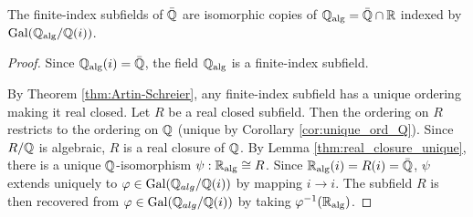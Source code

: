 \begin{theorem}
  \label{thm:Q_alg_unique_fin_ind}
  The finite-index subfields of $\bar{\mathbb{Q}}$ are isomorphic copies of $\mathbb{Q}_{\text{alg}}=\bar{\mathbb{Q}}\cap\mathbb{R}$ indexed by $\operatorname{Gal}(\mathbb{Q}_{\text{alg}}/\mathbb{Q}(i))$.
\end{theorem}
\begin{proof}
  Since $\mathbb{Q}_{\text{alg}}(i)=\bar{\mathbb{Q}}$, the field $\mathbb{Q}_{\text{alg}}$ is a finite-index subfield.

  By Theorem \ref{thm:Artin-Schreier}, any finite-index subfield has a unique ordering making it real closed. Let $R$ be a real closed subfield. Then the ordering on $R$ restricts to the ordering on $\mathbb{Q}$ (unique by Corollary \ref{cor:unique_ord_Q}). Since $R/\mathbb{Q}$ is algebraic, $R$ is a real closure of $\mathbb{Q}$. By Lemma \ref{thm:real_closure_unique}, there is a unique $\mathbb{Q}$-isomorphism $\psi:\mathbb{R}_{\text{alg}}\cong R$. Since $\mathbb{R}_{\text{alg}}(i)=R(i)=\bar{\mathbb{Q}}$, $\psi$ extends uniquely to $\varphi\in\operatorname{Gal}(\mathbb{Q}_{alg}/\mathbb{Q}(i))$ by mapping $i\to i$. The subfield $R$ is then recovered from $\varphi\in\operatorname{Gal}(\mathbb{Q}_{alg}/\mathbb{Q}(i))$ by taking $\varphi^{-1}(\mathbb{R}_{\text{alg}})$.
\end{proof}


